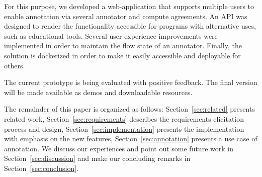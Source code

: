 For this purpose, we developed a web-application that supports multiple users to enable annotation via several annotator and compute agreements. 
An API was designed to render the functionality accessible for programs with alternative uses, such as educational tools. 
Several user experience improvements were implemented in order to maintain the flow state of an annotator.
Finally, the solution is dockerized in order to make it easily accessible and deployable for others. 

The current prototype is being evaluated with positive feedback. 
The final version will be made available as demos and downloadable resources. 

The remainder of this paper is organized as follows: 
Section~\ref{sec:related} presents related work, 
Section~\ref{sec:requirements} describes the requirements elicitation process and design, 
Section~\ref{sec:implementation} presents the implementation with emphasis on the new features, 
Section~\ref{sec:annotation} presents a use case of annotation.
We discuss our experiences and point out some future work in Section~\ref{sec:discussion} and make our concluding remarks in Section~\ref{sec:conclusion}.
